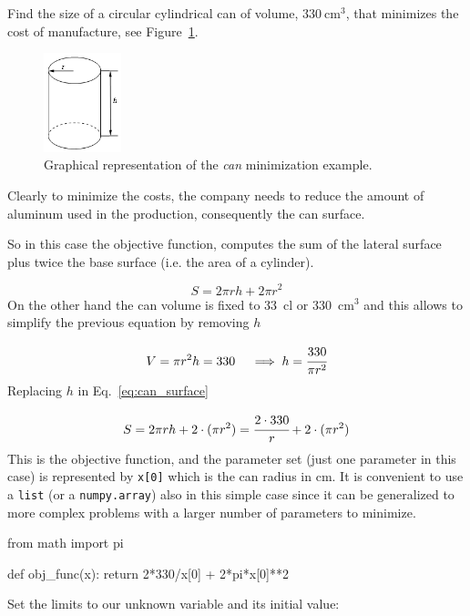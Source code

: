 Find the size of a circular cylindrical can of volume, \(330~\mathrm{cm}^3\), that minimizes the cost of manufacture, see Figure~\ref{fig:cylinder}.

\begin{figure}[h]
\centering
\includegraphics[width=0.2\textwidth]{figures/cylinder.png}
\caption{Graphical representation of the \emph{can} minimization example.}
\label{fig:cylinder}
\end{figure}

Clearly to minimize the costs, the company needs to reduce the amount of aluminum used in the production, consequently the can surface. 

So in this case the objective function, computes the sum of the lateral surface plus twice the base surface (i.e. the area of a cylinder).

\begin{equation} 
S = 2\pi rh + 2\pi r^2 
\label{eq:can_surface}
\end{equation}
On the other hand the can volume is fixed to 33~cl or 330~\(\mathrm{cm}^3\) and this allows to simplify the previous equation by removing \(h\)

\begin{equation*} 
V = \pi r^2 h = 330\quad\implies h = \cfrac{330}{\pi r^2}
\end{equation*}
Replacing $h$ in Eq.~\ref{eq:can_surface} 

\begin{equation}
S = 2\pi rh + 2\cdot(\pi r^2) = \cfrac{2\cdot 330}{r} + 2\cdot(\pi r^2)
\end{equation}
This is the objective function, and the parameter set (just one parameter in this case) is represented by \texttt{x[0]} which is the can radius in cm. It is convenient to use a \texttt{list} (or a \texttt{numpy.array}) also in this simple case since it can be generalized to more complex problems with a larger number of parameters to minimize. 

\begin{ipython}
from math import pi

def obj_func(x):
    return 2*330/x[0] + 2*pi*x[0]**2
\end{ipython}
\noindent
Set the limits to our unknown variable and its initial value:

